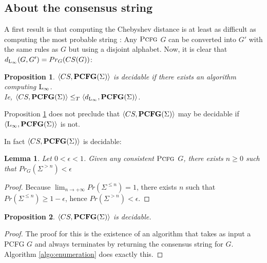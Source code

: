 \documentclass[submission]{eptcs} \usepackage{breakurl}             \usepackage[english]{babel}
\newtheorem{proposition}{Proposition}
\newtheorem{lemma}{Lemma}
\providecommand{\PCFGclass}{\textup{\textbf{PCFG}(\ensuremath{\Sigma})}}
\providecommand{\Linf}{\textup{L}\ensuremath{_{\infty}}}
\providecommand{\PCFG}{\ensuremath{\textsc{Pcfg}}}
\providecommand{\Prob}{\ensuremath{Pr}}
\begin{document}
\subsection{About the consensus string}
A first result is that computing the Chebyshev distance is at least as difficult as computing the most probable string :
Any $\PCFG$ $G$ can be converted into $G'$ with the same rules as $G$ but using a disjoint alphabet. Now, it is clear that $d_{\Linf}(G,G')=\Prob_G(CS(G))$:
\begin{proposition}\label{linking_CS_Linf}
$\langle CS,\PCFGclass\rangle$ is decidable if there exists an algorithm computing $\Linf$. \\
Ie, $\langle CS,\PCFGclass\rangle\le_T\langle d_{\Linf},\PCFGclass\rangle$.
\end{proposition}
Proposition \ref{linking_CS_Linf} does not preclude that $\langle CS,\PCFGclass\rangle$ may be decidable if $\langle \Linf,\PCFGclass\rangle$ is not.\

In fact $\langle CS,\PCFGclass\rangle$ is decidable:
\begin{lemma}\label{yes we can}
Let $0<\epsilon<1$. Given any consistent $\PCFG$ $G$, there exists $n\ge0$ such that $\Prob_G(\Sigma^{>n})<\epsilon$
\end{lemma}

\begin{proof}
Because $\lim_{n\rightarrow +\infty} 
\Prob(\Sigma^{\le n}) = 1$, 
there exists $n$ such that 
$\Prob(\Sigma^{\le n}) \geq 1 - \epsilon$,
hence $\Prob(\Sigma^{>n})<\epsilon$.
\end{proof}

\begin{proposition}\label{CS_is_decidable}
$\langle CS,\PCFGclass\rangle$ is decidable.
\end{proposition}
\begin{proof}
The proof for this is the existence of an algorithm that takes as input a PCFG $G$ and always terminates by returning the consensus string for $G$. Algorithm \ref{algo:enumeration} does exactly this.

\end{proof}
\end{document}
